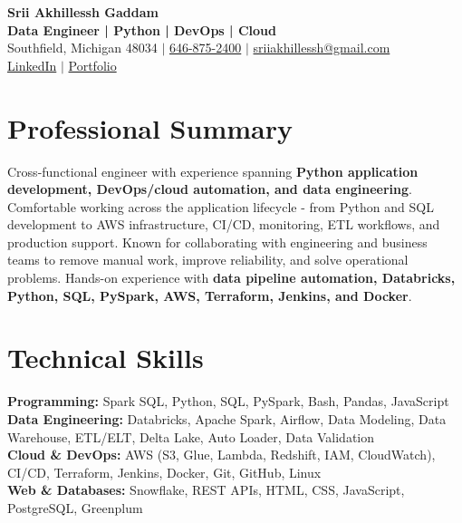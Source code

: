 \documentclass[letterpaper,10pt]{article}
\begin{document}
\fontsize{9.35pt}{10.45pt}\selectfont

\begin{center}
    {\LARGE \textbf{Srii Akhillessh Gaddam}} \\[-1pt]
    \textbf{Data Engineer | Python | DevOps | Cloud} \\[2pt]
    Southfield, Michigan 48034 $|$
    \href{tel:6468752400}{646-875-2400} $|$
    \href{mailto:sriiakhillessh@gmail.com}{sriiakhillessh@gmail.com} \\[1pt]
    \href{https://www.linkedin.com/in/srii-akhiilessh-gaddam-b48668191/}{LinkedIn} $|$
    \href{https://sriiakhillesshg.github.io/portfolio/}{Portfolio}
\end{center}
\vspace{-8pt}

\section{Professional Summary}
\small{Cross-functional engineer with experience spanning \textbf{Python application development, DevOps/cloud automation, and data engineering}. Comfortable working across the application lifecycle - from Python and SQL development to AWS infrastructure, CI/CD, monitoring, ETL workflows, and production support. Known for collaborating with engineering and business teams to remove manual work, improve reliability, and solve operational problems. Hands-on experience with \textbf{data pipeline automation, Databricks, Python, SQL, PySpark, AWS, Terraform, Jenkins, and Docker}.}

\section{Technical Skills}
\small{
\textbf{Programming:} Spark SQL, Python, SQL, PySpark, Bash, Pandas, JavaScript \\
\textbf{Data Engineering:} Databricks, Apache Spark, Airflow, Data Modeling, Data Warehouse, ETL/ELT, Delta Lake, Auto Loader, Data Validation \\
\textbf{Cloud \& DevOps:} AWS (S3, Glue, Lambda, Redshift, IAM, CloudWatch), CI/CD, Terraform, Jenkins, Docker, Git, GitHub, Linux \\
\textbf{Web \& Databases:} Snowflake, REST APIs, HTML, CSS, JavaScript, PostgreSQL, Greenplum
}
\end{document}
